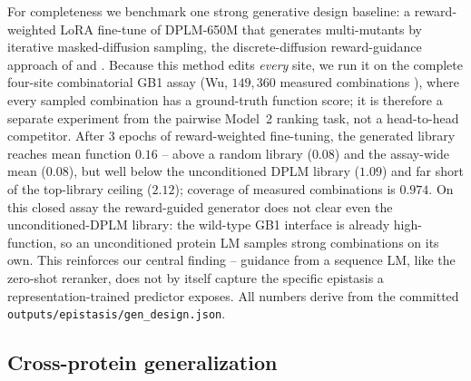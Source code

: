 \documentclass{article}
\begin{document}
For completeness we benchmark one strong generative design baseline: a reward-weighted
LoRA fine-tune of DPLM-650M that generates multi-mutants by iterative masked-diffusion
sampling, the discrete-diffusion reward-guidance approach of \citet{wang2025drakes} and
\citet{li2024svdd}. Because this method edits \emph{every} site, we run it on the complete
four-site combinatorial GB1 assay (Wu, $149{,}360$ measured combinations
\citep{wu2016adaptation}), where every sampled combination has a ground-truth function
score; it is therefore a separate experiment from the pairwise Model~2 ranking task, not a
head-to-head competitor. After $3$ epochs of reward-weighted fine-tuning, the generated
library reaches mean function $0.16$ -- above a random library ($0.08$) and the assay-wide
mean ($0.08$), but well below the unconditioned DPLM library ($1.09$) and far short of the
top-library ceiling ($2.12$); coverage of measured combinations is $0.974$. On this closed
assay the reward-guided generator does not clear even the unconditioned-DPLM library: the
wild-type GB1 interface is already high-function, so an unconditioned protein LM samples
strong combinations on its own. This reinforces our central finding -- guidance from a
sequence LM, like the zero-shot reranker, does not by itself capture the specific epistasis
a representation-trained predictor exposes. All numbers derive from the committed
\texttt{outputs/epistasis/gen\_design.json}.

\subsection{Cross-protein generalization}
\label{sec:results-e2e}
\end{document}
